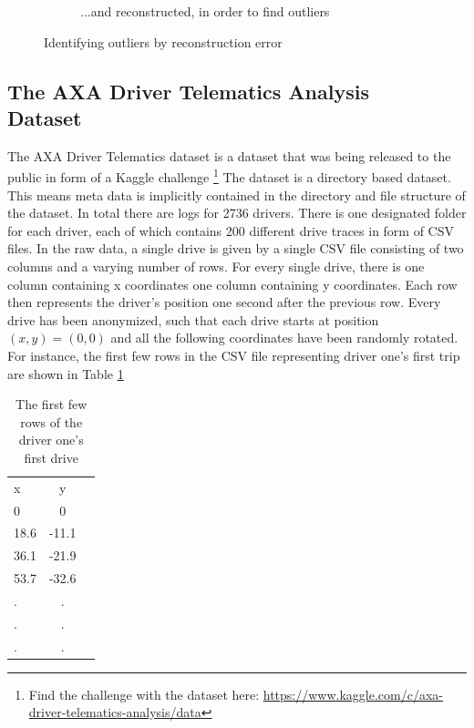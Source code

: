 \documentclass{vldb}
\begin{document}
\begin{figure}
\begin{subfigure}{.5\textwidth}
  \caption{...and reconstructed, in order to find outliers}
  \label{subfig:reduction-c}
\end{subfigure}
\caption{Identifying outliers by reconstruction error}
\label{fig:auto-encoder-reconstruction}
\end{figure}

\subsection{The AXA Driver Telematics Analysis \\Dataset}
\label{subsec:Metho-dataset}
The AXA Driver Telematics dataset is a dataset that was being released to the public in form of a Kaggle challenge 
\footnote{Find the challenge with the dataset here: \url{https://www.kaggle.com/c/axa-driver-telematics-analysis/data}}
The dataset is a directory based dataset. This means meta data is implicitly contained in the directory and file structure of the dataset. In total there are logs for 2736 drivers. There is one designated folder for each driver, each of which contains 200 different drive traces in form of CSV files. In the raw data, a single drive is given by a single CSV file consisting of two columns and a varying number of rows. For every single drive, there is one column containing x coordinates one column containing y coordinates. Each row then represents the driver's position one second after the previous row. Every drive has been anonymized, such that each drive starts at position $(x, y) = (0, 0)$ and all the following coordinates have been randomly rotated.\\ 
For instance, the first few rows in the CSV file representing driver one's first trip are shown in Table \ref{table:raw-trace}

\begin{table}
\centering
\begin{tabular}{l c r}
x & y\\
0 & 0\\
18.6 & -11.1 \\
36.1 & -21.9 \\
53.7 & -32.6 \\
. & .  \\
. & . \\
. & . \\	
\end{tabular}
\caption{The first few rows of the driver one's first drive}
\label{table:raw-trace}
\end{table}
\end{document}

